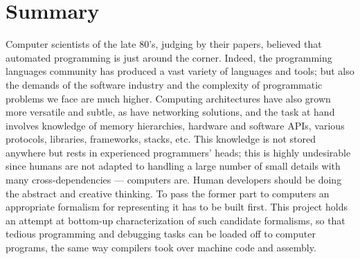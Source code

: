 \section{Summary}

Computer scientists of the late 80's, judging by their papers, believed that
automated programming is just around the corner.
Indeed, the programming languages community has produced a vast variety of
languages and tools; but also the demands of the software industry and the
complexity of programmatic problems we face are much higher.
Computing architectures have also grown more versatile and subtle, as have
networking solutions, and the task at hand involves knowledge of memory
hierarchies, hardware and software APIs, various protocols, libraries,
frameworks, stacks, etc.
This knowledge is not stored anywhere but rests in experienced programmers'
heads; this is highly undesirable since humans are not adapted to handling
a large number of small details with many cross-dependencies --- computers
are. Human developers should be doing the abstract and creative thinking.
To pass the former part to computers an appropriate formalism for representing
it has to be built first.
This project holds an attempt at bottom-up characterization of such candidate
formalisms, so that tedious programming and debugging tasks can be loaded
off to computer programs, the same way compilers took over machine code
and assembly.
